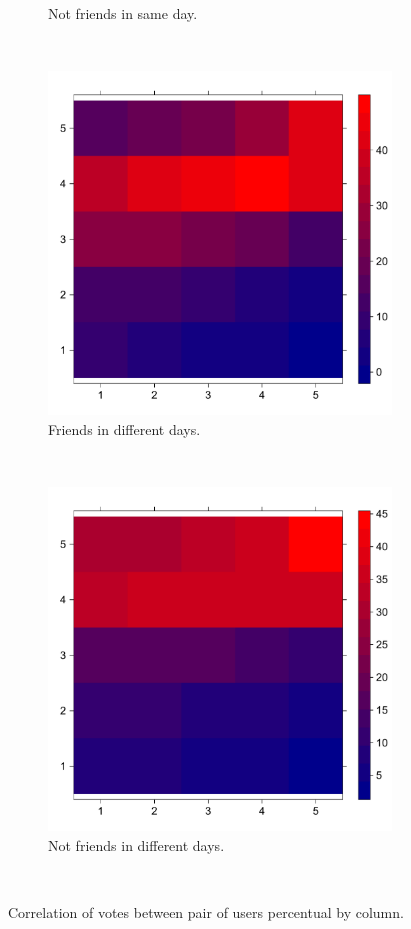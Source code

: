 \begin{figure}[H]
\begin{subfigure}[b]{0.5\textwidth}
    \caption{Not friends in same day.}\label{fig:nfri_eq}
  \end{subfigure}
  ~
  \begin{subfigure}[b]{0.5\textwidth}
    \captionsetup{font=small}
    \includegraphics[width=\textwidth]{img/amig_dif_n}
    \caption{Friends in different days.}\label{fig:fri_dif}
  \end{subfigure}%
  ~
  \begin{subfigure}[b]{0.5\textwidth}
    \captionsetup{font=small}
    \includegraphics[width=\textwidth]{img/namig_dif_n}
    \caption{Not friends in different days.}\label{fig:nfri_dif}
  \end{subfigure}
  ~
  \caption{Correlation of votes between pair of users percentual by column.}
  \label{fig:rat_heat}
\end{figure}

